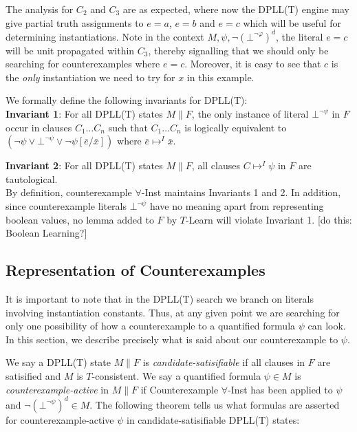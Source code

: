 \documentclass{llncs}
\begin{document}
The analysis for $C_2$ and $C_3$ are as expected, where now the DPLL(T) engine may give partial truth assignments to $e = a$, $e = b$ and $e = c$ which will be useful for determining instantiations.
Note in the context $M, \psi, \neg( \bot^{\neg \varphi} )^d$, the literal $e = c$ will be unit propagated within $C_3$, thereby signalling that we should only be searching for counterexamples where $e = c$.
Moreover, it is easy to see that $c$ is the \emph{only} instantiation we need to try for $x$ in this example.

We formally define the following invariants for DPLL(T): \\

{\bf Invariant 1}:
For all DPLL(T) states $M \parallel F$, the only instance of literal $\bot^{\neg \psi}$ in $F$ occur in clauses $C_1 \ldots C_n$ such that $C_1 \ldots C_n$ is logically equivalent to $( \neg \psi \vee \bot^{\neg \psi} \vee \neg \psi[\bar{e}/\bar{x}] )$ where $\bar{e} \mapsto^I \bar{x}$.

{\bf Invariant 2}:
For all DPLL(T) states $M \parallel F$, all clauses $C \mapsto^I \psi$ in $F$ are tautological. \\

By definition, counterexample $\forall$-Inst maintains Invariants 1 and 2.
In addition, since counterexample literals $\bot^{ \neg \psi }$ have no meaning apart from representing boolean values, no lemma added to $F$ by $T$-Learn will violate Invariant 1.
[do this: Boolean Learning?]

\subsection{Representation of Counterexamples}

It is important to note that in the DPLL(T) search we branch on literals involving instantiation constants.
Thus, at any given point we are searching for only one possibility of how a counterexample to a quantified formula $\psi$ can look.
In this section, we describe precisely what is said about our counterexample to $\psi$.

We say a DPLL(T) state $M \parallel F$ is \emph{candidate-satisifiable} if all clauses in $F$ are satisified and $M$ is $T$-consistent.
We say a quantified formula $\psi \in M$ is \emph{counterexample-active} in $M \parallel F$ if Counterexample $\forall$-Inst has been applied to $\psi$ and $\neg (\bot^{\neg \psi})^d \in M$.
The following theorem tells us what formulas are asserted for counterexample-active $\psi$ in candidate-satisifiable DPLL(T) states:
\end{document}
